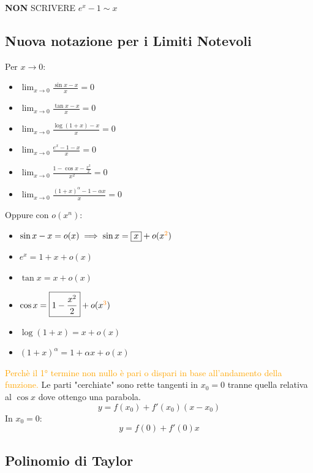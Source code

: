 \begin{tcolorbox}[colback=red!5!white,colframe=red!55!black,title=Attenzione]
    \textbf{NON} SCRIVERE $e^x-1\sim x$
\end{tcolorbox}

\subsection{Nuova notazione per i Limiti Notevoli}

Per $x \to 0$:
\begin{itemize}
    \item $\displaystyle \lim_{ x \to 0 } \frac{\sin x -x}{x} = 0$
    \item $\displaystyle \lim_{ x \to 0 } \frac{\tan x -x}{x} = 0$
    \item $\displaystyle \lim_{ x \to 0 } \frac{\log(1+x)-x}{x} = 0$
    \item $\displaystyle \lim_{ x \to 0 } \frac{e^x -1 -x}{x} = 0$
    \item $\displaystyle \lim_{ x \to 0 } \frac{1- \cos x -\frac{x^2}{2}}{x^2} = 0$
    \item $\displaystyle \lim_{ x \to 0 } \frac{(1+x)^\alpha -1 -\alpha x}{x} = 0$
\end{itemize}

Oppure con $o(x^n)$:
\begin{itemize}
    \item $\sin x -x = o(x) \implies \sin x=\boxed{x} + o(x^{\textcolor{orange}{2}})$
    \item $e^x=\boxed{1 +x} + o(x)$
    \item $\tan x= \boxed{x} +o(x)$
    \item $\cos x=\boxed{1 - \frac{x^2}{2}}+ o(x^{\textcolor{orange}{3}})$
    \item $\log(1+x)=\boxed{x}+o(x)$
    \item $(1+x)^\alpha=\boxed{1+\alpha x} + o(x)$
\end{itemize}
\textcolor{orange}{Perchè il 1° termine non nullo è pari o dispari in base all'andamento della funzione.}
Le parti $\boxed{\text{"cerchiate"}}$ sono rette tangenti in $x_{0}=0$ tranne quella relativa al $\cos x$ dove ottengo una parabola.
\[ y=f(x_{0})+f'(x_{0})(x-x_{0}) \]
In $x_{0}=0$:
\[ y=f(0)+f'(0)x \]

\subsection{Polinomio di Taylor}

